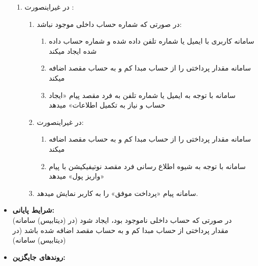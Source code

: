 \documentclass{article}
\begin{document}
\begin{itemize}
\begin{enumerate}
\item در غیراینصورت	:
\begin{enumerate}
\item در صورتی که شماره حساب داخلی موجود نباشد:
\begin{enumerate}
\item سامانه کاربری با ایمیل یا شماره تلفن داده شده و شماره حساب داده شده ایجاد میکند
\item سامانه مقدار پرداختی را از حساب مبدا کم و به حساب مقصد اضافه میکند
\item سامانه با توجه به ایمیل یا شماره تلفن به فرد مقصد پیام «ایجاد حساب و نیاز به تکمیل اطلاعات» میدهد
\end{enumerate}
\item در غیراینصورت:
\begin{enumerate}
\item سامانه مقدار پرداختی را از حساب مبدا کم و به حساب مقصد اضافه میکند
\item سامانه با توجه به شیوه اطلاع رسانی فرد مقصد نوتیفیکیشن با پیام «واریز پول» میدهد
\end{enumerate}
\item سامانه پیام «پرداخت موفق» را به کاربر نمایش میدهد.
\end{enumerate}

\end{enumerate}

\item \textbf{شرایط پایانی:}\\ 
در صورتی که حساب داخلی ناموجود بود، ایجاد شود (در (دیتابیس) سامانه)\\
مقدار پرداختی از حساب مبدا کم و به حساب مقصد اضافه شده باشد (در (دیتابیس) سامانه)
\item \textbf{روندهای جایگزین:}\\

\end{itemize}


\noindent\makebox[\linewidth]{\rule{\paperwidth}{0.4pt}}
\end{document}
